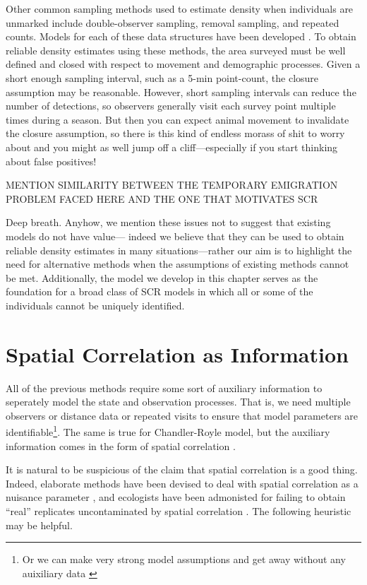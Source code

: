 Other common sampling methods used to estimate density when individuals are
unmarked include double-observer sampling, removal sampling, and
repeated counts. Models for each of these data structures have been
developed
\citep{nichols_etal:2000,farnsworth_etal:2002,royle:2004,royle:2004abc}. To
obtain reliable density estimates using these
methods, the area surveyed must be well defined and closed with
respect to movement and demographic processes. Given a short enough
sampling interval, such as a 5-min point-count, the closure
assumption may be reasonable. However, short sampling intervals can
reduce the number of detections, so observers generally visit each survey
point multiple times during a season. But then you can expect animal
movement to invalidate the closure assumption, so there is this kind
of endless morass of shit to worry about and you might as well jump
off a cliff---especially if you start thinking about false positives!

MENTION SIMILARITY BETWEEN THE TEMPORARY EMIGRATION PROBLEM FACED HERE
AND THE ONE THAT MOTIVATES SCR

Deep breath. Anyhow, we mention these issues not to suggest that
existing models do not have value---
indeed we believe that they can be used to obtain reliable density
estimates in many situations---rather our aim is to highlight the need for
alternative methods when the assumptions of existing methods cannot be
met. Additionally, the model we develop in this chapter serves as the
foundation for a broad class of SCR models in which all or some of the
individuals cannot be uniquely identified.



\section{Spatial Correlation as Information}
\label{Sect.corr-info}

All of the previous methods require some sort of auxiliary information
to seperately model the state and observation processes. That is, we
need multiple observers or distance data or repeated visits to ensure
that model parameters are identifiable\footnote{Or we can make very
  strong model assumptions and get away without any auixiliary data
  \citep{lele_etal:2012}}. The same is true for Chandler-Royle model,
but the auxiliary information comes in the form of spatial correlation
\citep{chandler_royle:2012}.

It is natural to be suspicious of the claim that spatial correlation
is a good thing. Indeed, elaborate methods have been devised to deal
with spatial correlation as a nuisance parameter
\citep{dormann_etal:2007}, and ecologists have been admonisted for
failing to obtain ``real'' replicates uncontaminated by spatial
correlation \citep{hurlbert:1984}. The following heuristic may be
helpful.


